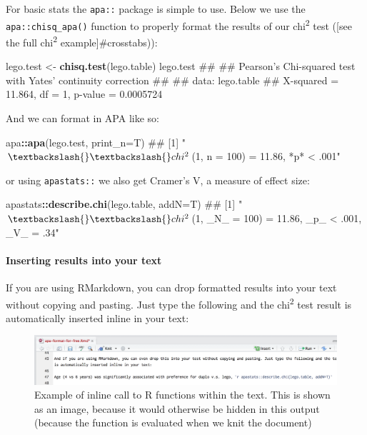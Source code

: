 \documentclass[]{article}
\newenvironment{Shaded}{\begin{snugshade}}{\end{snugshade}}
\newcommand{\KeywordTok}[1]{\textcolor[rgb]{0.13,0.29,0.53}{\textbf{#1}}}
\newcommand{\DataTypeTok}[1]{\textcolor[rgb]{0.13,0.29,0.53}{#1}}
\newcommand{\StringTok}[1]{\textcolor[rgb]{0.31,0.60,0.02}{#1}}
\newcommand{\OperatorTok}[1]{\textcolor[rgb]{0.81,0.36,0.00}{\textbf{#1}}}
\newcommand{\NormalTok}[1]{#1}
\let\oldparagraph\paragraph
\renewcommand{\paragraph}[1]{\oldparagraph{#1}\mbox{}}
\theoremstyle{definition}
\theoremstyle{definition}
\theoremstyle{definition}
\theoremstyle{remark}
\begin{document}
For basic stats the \texttt{apa::} package is simple to use. Below we
use the \texttt{apa::chisq\_apa()} function to properly format the
results of our chi\textsuperscript{2} test ({[}see the full
chi\textsuperscript{2} example{]}\#crosstabs)):

\begin{Shaded}
\begin{Highlighting}[]
\NormalTok{lego.test <-}\StringTok{ }\KeywordTok{chisq.test}\NormalTok{(lego.table)}
\NormalTok{lego.test}
\NormalTok{## }
\NormalTok{##  Pearson's Chi-squared test with Yates' continuity correction}
\NormalTok{## }
\NormalTok{## data:  lego.table}
\NormalTok{## X-squared = 11.864, df = 1, p-value = 0.0005724}
\end{Highlighting}
\end{Shaded}

And we can format in APA like so:

\begin{Shaded}
\begin{Highlighting}[]
\NormalTok{apa}\OperatorTok{::}\KeywordTok{apa}\NormalTok{(lego.test, }\DataTypeTok{print_n=}\NormalTok{T)}
\NormalTok{## [1] "$\textbackslash{}\textbackslash{}chi^2$(1, n = 100) = 11.86, *p* < .001"}
\end{Highlighting}
\end{Shaded}

or using \texttt{apastats::} we also get Cramer's V, a measure of effect
size:

\begin{Shaded}
\begin{Highlighting}[]
\NormalTok{apastats}\OperatorTok{::}\KeywordTok{describe.chi}\NormalTok{(lego.table, }\DataTypeTok{addN=}\NormalTok{T)}
\NormalTok{## [1] "$\textbackslash{}\textbackslash{}chi^2$(1, _N_ = 100) = 11.86, _p_ < .001, _V_ = .34"}
\end{Highlighting}
\end{Shaded}

\paragraph{Inserting results into your text}\label{inline-apa-format}

If you are using RMarkdown, you can drop formatted results into your
text without copying and pasting. Just type the following and the
chi\textsuperscript{2} test result is automatically inserted inline in
your text:

\begin{figure}
\centering
\includegraphics{media/inline-r-example.png}
\caption{Example of inline call to R functions within the text. This is
shown as an image, because it would otherwise be hidden in this output
(because the function is evaluated when we knit the document)}
\end{figure}
\end{document}
